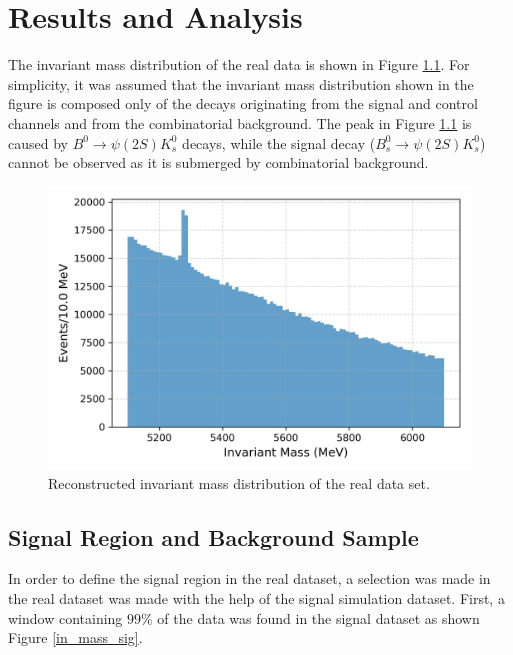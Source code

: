 \chapter{Results and Analysis}

The invariant mass distribution of the real data is shown in Figure \ref{inv_mass_data}. For simplicity, it was assumed that the invariant mass distribution shown in the figure is composed only of the decays originating from the signal and control channels and from the combinatorial background. The peak in Figure \ref{inv_mass_data} is caused by $B^{0} \rightarrow \psi(2S)K_{s}^{0}$ decays, while the signal decay ($B_{s}^{0} \rightarrow \psi(2S)K_{s}^{0}$) cannot be observed as it is submerged by combinatorial background.\\   
    \begin{figure}[H]
        \centering
        \includegraphics[width=0.7\linewidth]{Figure/2_data_invariant_mass_distribution.png}
        \caption{Reconstructed invariant mass distribution of the real data set.}
        \label{inv_mass_data}
    \end{figure}

    \section{Signal Region and Background Sample}
    In order to define the signal region in the real dataset, a selection was made in the real dataset was made with the help of the signal simulation dataset. First, a window containing $99\%$ of the data was found in the signal dataset as shown Figure \ref{in_mass_sig}.\\

